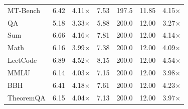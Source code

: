 \documentclass[letterpaper,twocolumn,10pt]{article}
\begin{document}
\begin{table}[t]
\begin{tabular}{lcccccc}
MT-Bench    & 6.42 & 4.11$\times$ & 7.53  & 197.5 & 11.85 & 4.15$\times$ \\
QA          & 5.18 & 3.33$\times$ & 5.88  & 200.0 & 12.00 & 3.27$\times$ \\
Sum         & 6.66 & 4.16$\times$ & 7.81  & 200.0 & 12.00 & 4.14$\times$ \\
Math        & 6.16 & 3.99$\times$ & 7.38  & 200.0 & 12.00 & 4.09$\times$ \\
LeetCode    & 6.89 & 4.52$\times$ & 8.15  & 200.0 & 12.00 & 4.54$\times$ \\
MMLU        & 6.14 & 4.03$\times$ & 7.15  & 200.0 & 12.00 & 3.98$\times$ \\
BBH         & 6.41 & 4.18$\times$ & 7.61  & 200.0 & 12.00 & 4.23$\times$ \\
TheoremQA   & 6.15 & 4.04$\times$ & 7.13  & 200.0 & 12.00 & 3.97$\times$ \\
\bottomrule
\end{tabular}
\end{table}
\end{document}
